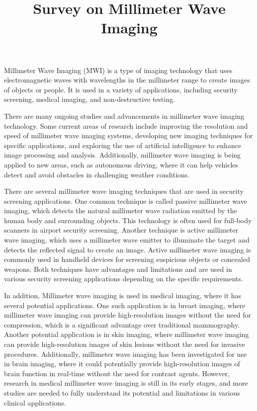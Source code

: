 \documentclass[11pt, oneside]{article}   	%
\title{Survey on Millimeter Wave Imaging}
\begin{document}
\maketitle



Millimeter Wave Imaging (MWI) is a type of imaging technology that uses electromagnetic waves with wavelengths in the millimeter range to create images of objects or people. It is used in a variety of applications, including security screening, medical imaging, and non-destructive testing.

There are many ongoing studies and advancements in millimeter wave imaging technology. Some current areas of research include improving the resolution and speed of millimeter wave imaging systems, developing new imaging techniques for specific applications, and exploring the use of artificial intelligence to enhance image processing and analysis. Additionally, millimeter wave imaging is being applied to new areas, such as autonomous driving, where it can help vehicles detect and avoid obstacles in challenging weather conditions.

There are several millimeter wave imaging techniques that are used in security screening applications. One common technique is called passive millimeter wave imaging, which detects the natural millimeter wave radiation emitted by the human body and surrounding objects. This technology is often used for full-body scanners in airport security screening. Another technique is active millimeter wave imaging, which uses a millimeter wave emitter to illuminate the target and detects the reflected signal to create an image. Active millimeter wave imaging is commonly used in handheld devices for screening suspicious objects or concealed weapons. Both techniques have advantages and limitations and are used in various security screening applications depending on the specific requirements.

In addition, Millimeter wave imaging is used in medical imaging, where it has several potential applications. One such application is in breast imaging, where millimeter wave imaging can provide high-resolution images without the need for compression, which is a significant advantage over traditional mammography. Another potential application is in skin imaging, where millimeter wave imaging can provide high-resolution images of skin lesions without the need for invasive procedures. Additionally, millimeter wave imaging has been investigated for use in brain imaging, where it could potentially provide high-resolution images of brain function in real-time without the need for contrast agents. However, research in medical millimeter wave imaging is still in its early stages, and more studies are needed to fully understand its potential and limitations in various clinical applications.
\end{document}
